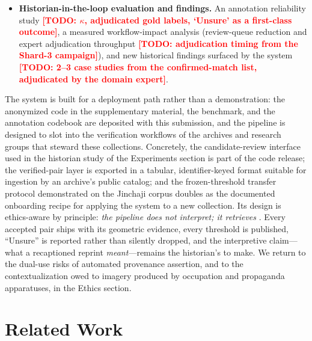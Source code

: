 \documentclass[letterpaper]{article} %
\newcommand{\todo}[1]{\textcolor{red}{\textbf{[TODO: #1]}}}
\begin{document}
\begin{itemize}
  (2{,}146 photographs, 1{,}122 pages, 4{,}390 crops, 230 annotated pairs)
  studied by prior retrieval-only work
  \cite{du2024probing}. \todo{Retrieval Recall@10/15 and mAP over the 230
  verified pairs + verification P/R/F1 conditional on hand-labeled filter
  survivors, thresholds frozen --- Jinchaji run W10. Jinchaji side releases
  annotations and identifiers only, no images.}
\item \textbf{Historian-in-the-loop evaluation and findings.} An annotation
  reliability study \todo{$\kappa$, adjudicated gold labels, `Unsure' as a
  first-class outcome}, a measured workflow-impact analysis (review-queue
  reduction and expert adjudication throughput \todo{adjudication timing
  from the Shard-3 campaign}),
  and new historical findings surfaced by the system \todo{2--3 case studies
  from the confirmed-match list, adjudicated by the domain expert}.
\end{itemize}

The system is built for a deployment path rather than a demonstration: the
anonymized code in the supplementary material, the benchmark, and the
annotation codebook are deposited with this submission, and the pipeline is
designed to slot into the verification workflows of the archives and research
groups that steward these collections. Concretely, the candidate-review
interface used in the historian study of the Experiments section is part of
the code release; the verified-pair layer is exported in a tabular,
identifier-keyed format suitable for ingestion by an archive's public
catalog; and the frozen-threshold transfer protocol demonstrated on the
Jinchaji corpus doubles as the documented onboarding recipe for applying the
system to a new collection. Its design is ethics-aware by
principle: \emph{the pipeline does not interpret; it retrieves}
\cite{du2026evidence}. Every accepted pair ships with its geometric evidence,
every threshold is published, ``Unsure'' is reported rather than silently
dropped, and the interpretive claim---what a recaptioned reprint
\emph{meant}---remains the historian's to make. We return to the dual-use
risks of automated provenance assertion, and to the contextualization owed to
imagery produced by occupation and propaganda apparatuses, in the Ethics
section.

\section{Related Work}
\label{sec:related}
\end{document}
